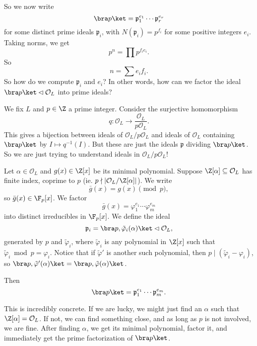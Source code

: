 \documentclass[a4paper]{article}
\begin{document}
So we now write
\[
  \bra p\ket = \mathfrak{p}_1^{e_1} \cdots \mathfrak{p}_r^{e_r}
\]
for some distinct prime ideals $\mathfrak{p}_i$, with $N(\mathfrak{p}_i) = p^{f_i}$ for some positive integers $e_i$. Taking norms, we get
\[
  p^n = \prod p^{f_i e_i}.
\]
So
\[
  n = \sum e_i f_i.
\]
So how do we compute $\mathfrak{p}_i$ and $e_i$? In other words, how can we factor the ideal $\bra p\ket \lhd \mathcal{O}_L$ into prime ideals?

We fix $L$ and $p \in \Z$ a prime integer. Consider the surjective homomorphism
\[
  q: \mathcal{O}_L \to \frac{\mathcal{O}_L}{p \mathcal{O}_L}.
\]
This gives a bijection between ideals of $\mathcal{O}_L/p \mathcal{O}_L$ and ideals of $\mathcal{O}_L$ containing $\bra p\ket$ by $I \mapsto q^{-1}(I)$. But these are just the ideals $\mathfrak{p}$ dividing $\bra p\ket$. So we are just trying to understand ideals in $\mathcal{O}_L/p \mathcal{O}_L$!

\begin{thm}
  Let $\alpha \in \mathcal{O}_L$ and $g(x) \in \Z[x]$ be its minimal polynomial. Suppose $\Z[\alpha] \subseteq \mathcal{O}_L$ has finite index, coprime to $p$ (ie. $p \nmid |\mathcal{O}_L/\Z[\alpha]|$). We write
  \[
    \bar{g}(x) = g(x) \pmod p,
  \]
  so $\bar{g}(x) \in \F_p[x]$. We factor
  \[
    \bar{g}(x) = \varphi_1^{e_1} \cdots \varphi_m^{e_m}
  \]
  into distinct irreducibles in $\F_p[x]$. We define the ideal
  \[
    \mathfrak{p}_i = \bra p, \tilde{\varphi}_i(\alpha)\ket \lhd \mathcal{O}_L,
  \]
  generated by $p$ and $\tilde{\varphi}_i$, where $\tilde{\varphi}_i$ is any polynomial in $\Z[x]$ such that $\tilde{\varphi}_i \bmod p = \varphi_i$. Notice that if $\tilde{\varphi}'$ is another such polynomial, then $p \mid (\tilde{\varphi}_i - \varphi_i)$, so $\bra p, \tilde{\varphi}'(\alpha)\ket = \bra p, \tilde{\varphi}(\alpha)\ket$.

  Then
  \[
    \bra p\ket = \mathfrak{p}_1^{e_1} \cdots \mathfrak{p}_m^{e_m}.
  \]
\end{thm}
This is incredibly concrete. If we are lucky, we might just find an $\alpha$ such that $\Z[\alpha] = \mathcal{O}_L$. If not, we can find something close, and as long as $p$ is not involved, we are fine. After finding $\alpha$, we get its minimal polynomial, factor it, and immediately get the prime factorization of $\bra p\ket$.
\end{document}
